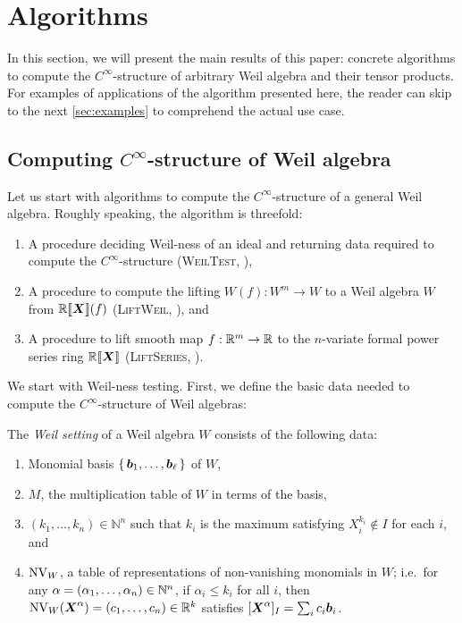 \section{Algorithms}\label{sec:alg}
In this section, we will present the main results of this paper: concrete algorithms to compute the $C^\infty$-structure of arbitrary Weil algebra and their tensor products.
For examples of applications of the algorithm presented here, the reader can skip to the next \cref{sec:examples} to comprehend the actual use case.

\subsection{Computing $C^\infty$-structure of Weil algebra}
\label{sec:general-weil-algs}
Let us start with algorithms to compute the $C^\infty$-structure of a general Weil algebra.
Roughly speaking, the algorithm is threefold:

\begin{enumerate}
  \item A procedure deciding Weil-ness of an ideal and returning data required to compute the $C^\infty$-structure (\textsc{WeilTest}, ),
  \item A procedure to compute the lifting  $W(f): W^m \to W$ to a Weil algebra $W$ from $\mathord{\mathbb{R}\llbracket\boldsymbol{X}\rrbracket}(f)$ (\textsc{LiftWeil}, ), and
  \item A procedure to lift smooth map $f: \mathbb{R}^m \to \mathbb{R}$ to the $n$-variate formal power series ring $\mathord{\mathbb{R}\llbracket\boldsymbol{X}\rrbracket}$ (\textsc{LiftSeries}, ).\label{step:lift-series}
\end{enumerate}

We start with Weil-ness testing.
First, we define the basic data needed to compute the $C^\infty$-structure of Weil algebras:

\begin{definition}
  The \emph{Weil setting} of a Weil algebra $W$ consists of the following data:
  \begin{enumerate}[ref=(\arabic*)]
    \item Monomial basis $\set{\boldsymbol{b}_1, \dots, \boldsymbol{b}_\ell}$ of $W$,
    \item $M$, the multiplication table of $W$ in terms of the basis,
    \item $(k_1, \dots, k_n) \in \mathbb{N}^n$ such that $k_i$ is the maximum satisfying $X_i^{k_i} \notin I$ for each $i$, and
    \item $\operatorname{NV}_W$, a table of representations of non-vanishing monomials in $W$;
    i.e.\ for any $\alpha = (\alpha_1, \dots, \alpha_n) \in \mathbb{N}^n$, if $\alpha_i \leq k_i$ for all $i$, then $\operatorname{NV}_W(\boldsymbol{X}^\alpha) = (c_1, \dots, c_n) \in \mathbb{R}^k$ satisfies $[\boldsymbol{X}^\alpha]_I = \sum_i c_i \boldsymbol{b}_i$.\label{item:nonvan}
  \end{enumerate}
\end{definition}

